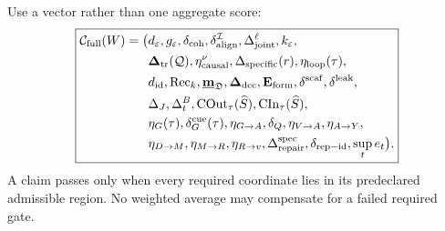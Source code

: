 

Use a vector rather than one aggregate score:
\[
\boxed{
\begin{aligned}
\mathcal C_{\mathrm{full}}(W)
=\bigl(&
 d_\varepsilon,
 g_\varepsilon,
 \delta_{\mathrm{coh}},
 \delta_{\mathrm{align}}^{\mathcal I},
 \Delta_{\mathrm{joint}}^\ell,
 k_\varepsilon,\\
&\boldsymbol\Delta_{\mathrm{tr}}(\mathcal Q),
 \eta_{\mathrm{causal}}^\nu,
 \Delta_{\mathrm{specific}}(r),
 \eta_{\mathrm{loop}}(\tau),\\
&d_{\mathrm{id}},
 \operatorname{Rec}_k,
 \underline{\mathbf m}_{\mathfrak D},
 \boldsymbol\Delta_{\mathrm{dec}},
 \mathbf E_{\mathrm{form}},
 \delta^{\mathrm{scaf}},
 \delta^{\mathrm{leak}},\\
&\Delta_J,
 \Delta_t^B,
 \operatorname{COut}_\tau(\widehat S),
 \operatorname{CIn}_\tau(\widehat S),\\
&\eta_G(\tau),
 \delta_G^{\mathrm{cue}}(\tau),
 \eta_{G\to A},
 \delta_Q,
 \eta_{V\to A},
 \eta_{A\to Y},\\
&\eta_{D\to M},
 \eta_{M\to R},
 \eta_{R\to v},
 \Delta_{\mathrm{repair}}^{\mathrm{spec}},
 \delta_{\mathrm{rep-id}},
 \sup_t e_t
\bigr).
\end{aligned}
}
\]
A claim passes only when every required coordinate lies in its predeclared
admissible region. No weighted average may compensate for a failed required
gate.


